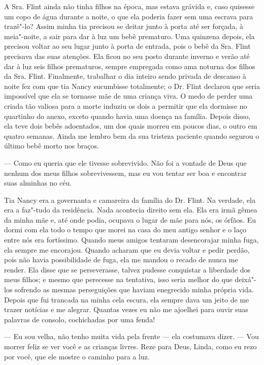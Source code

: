 A Sra. Flint ainda não tinha filhos na
época, mas estava grávida e, caso quisesse um copo de água durante a
noite, o que ela poderia fazer sem uma escrava para trazê"-lo? Assim
minha tia precisou se deitar junto à porta até ser forçada, à
meia"-noite, a sair para dar à luz um bebê prematuro. Uma quinzena
depois, ela precisou voltar ao seu lugar junto à porta de entrada, pois
o bebê da Sra. Flint precisava das suas atenções. Ela ficou no seu posto
durante inverno e verão até dar à luz seis filhos prematuros, sempre
empregada como ama noturna dos filhos da Sra. Flint. Finalmente,
trabalhar o dia inteiro sendo privada de descanso à noite fez com que
tia Nancy sucumbisse totalmente; o Dr. Flint declarou que seria
impossível que ela se tornasse mãe de uma criança viva. O medo de perder
uma criada tão valiosa para a morte induziu os dois a permitir que ela
dormisse no quartinho do anexo, exceto quando havia uma doença na
família. Depois disso, ela teve dois bebês adoentados, um dos quais
morreu em poucos dias, o outro em quatro semanas. Ainda me lembro bem da
sua tristeza paciente quando segurou o último bebê morto nos braços.

--- Como eu queria que ele tivesse sobrevivido. Não foi a vontade de
Deus que nenhum dos meus filhos sobrevivessem, mas eu vou tentar ser boa
e encontrar suas alminhas no céu.

Tia Nancy era a governanta e camareira
da família do Dr. Flint. Na verdade, ela era a faz"-tudo da residência.
Nada acontecia direito sem ela. Ela era irmã gêmea da minha mãe e, até
onde podia, ocupava o lugar de mãe para nós, os órfãos. Eu dormi com ela
todo o tempo que morei na casa do meu antigo senhor e o laço entre nós
era fortíssimo. Quando meus amigos tentaram desencorajar minha fuga, ela
sempre me encorajou. Quando acharam que eu devia voltar e pedir perdão,
pois não havia possibilidade de fuga, ela me mandou o recado de nunca me
render. Ela disse que se perseverasse, talvez pudesse conquistar a
liberdade dos meus filhos; e mesmo que perecesse na tentativa, isso
seria melhor do que deixá"-los sofrendo as mesmas perseguições que haviam
enegrecido minha própria vida. Depois que fui trancada na minha cela
escura, ela sempre dava um jeito de me trazer notícias e me alegrar.
Quantas vezes eu não me ajoelhei para ouvir suas palavras de consolo,
cochichadas por uma fenda!

--- Eu sou velha, não tenho muita vida pela frente --- ela costumava
dizer. --- Vou morrer feliz se ver você e as crianças livres. Reze para
Deus, Linda, como eu rezo por você, que ele mostre o caminho para a luz.


